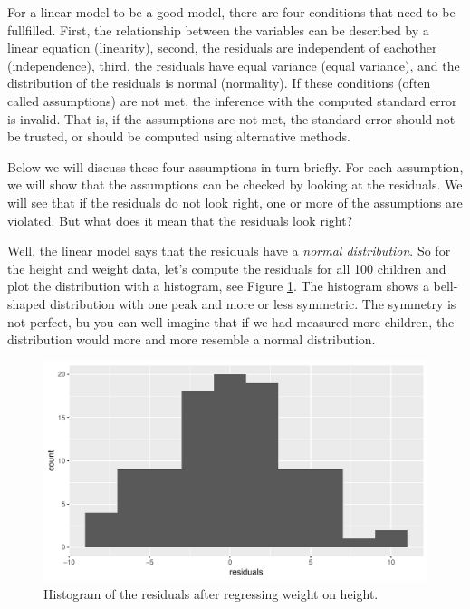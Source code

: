 \documentclass[]{report}\usepackage[]{graphicx}\usepackage[]{color}
\makeatletter
\def\maxwidth{ %
  \ifdim\Gin@nat@width>\linewidth
    \linewidth
  \else
    \Gin@nat@width
  \fi
}
\newenvironment{knitrout}{}{} %
\makeatother
\begin{document}
For a linear model to be a good model, there are four conditions that need to be fullfilled. First, the relationship between the variables can be described by a linear equation (linearity), second, the residuals are independent of eachother (independence), third, the residuals have equal variance (equal variance), and the distribution of the residuals is normal (normality). If these conditions (often called assumptions) are not met, the inference with the computed standard error is invalid. That is, if the assumptions are not met, the standard error should not be trusted, or should be computed using alternative methods. 

Below we will discuss these four assumptions in turn briefly. For each assumption, we will show that the assumptions can be checked by looking at the residuals. We will see that if the residuals do not look right, one or more of the assumptions are violated. But what does it mean that the residuals look right?

Well, the linear model says that the residuals have a \textit{normal distribution}. So for the height and weight data, let's compute the residuals for all 100 children and plot the distribution with a histogram, see Figure \ref{fig:ass_3}. The histogram shows a bell-shaped distribution with one peak and more or less symmetric. The symmetry is not perfect, bu you can well imagine that if we had measured more children, the distribution would more and more resemble a normal distribution. 

\begin{knitrout}
\color{fgcolor}\begin{figure}

{\centering \includegraphics[width=\maxwidth]{figure/ass_3-1} 

}

\caption[Histogram of the residuals after regressing weight on height]{Histogram of the residuals after regressing weight on height.}\label{fig:ass_3}
\end{figure}


\end{knitrout}
\end{document}
